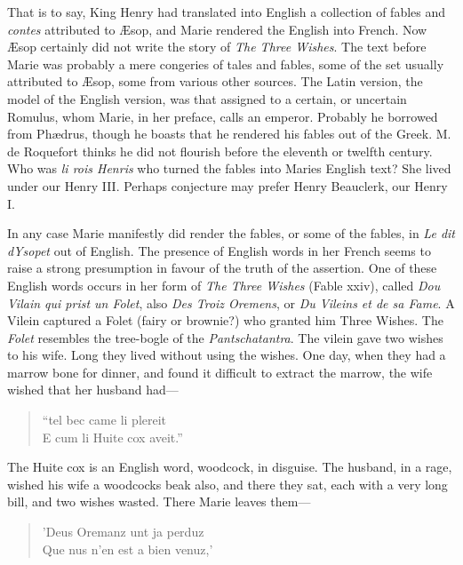 \documentclass[14pt,a4paper]{memoir}
\begin{document}
{That is to say, King Henry had translated into English a collection of
fables and \emph{contes} attributed to Æsop, and Marie rendered the
English into French. Now Æsop certainly did not write the story of
\emph{The Three Wishes}. The text before Marie was probably a mere
congeries of tales and fables, some of the set usually attributed to
Æsop, some from various other sources. The Latin version, the model of
the English version, was that assigned to a certain, or uncertain
Romulus, whom Marie, in her preface, calls an emperor. Probably he
borrowed from Phædrus, though he boasts that he rendered his fables out
of the Greek. M. de Roquefort thinks he did not flourish before the
eleventh or twelfth
century.
Who was \emph{li rois Henris} who turned the fables into
Marie\textquotesingle s English text? She lived under our Henry III.
Perhaps conjecture may prefer Henry Beauclerk, our Henry I.

In any case Marie manifestly did render the fables, or some of the
fables, in \emph{Le dit d\textquotesingle Ysopet} out of English. The
presence of English words in her French seems to raise a strong
presumption in favour of the truth of the assertion. One of these
English words occurs in her form of \emph{The Three Wishes} (Fable
xxiv), called \emph{Dou Vilain qui prist un Folet}, also \emph{Des Troiz
Oremens}, or \emph{Du Vileins et de sa Fame}. A Vilein captured a Folet
(fairy or brownie?) who granted him Three Wishes. The \emph{Folet}
resembles the tree-bogle of the \emph{Pantschatantra}. The vilein gave
two wishes to his wife. Long they lived without using the wishes. One
day, when they had a marrow bone for dinner, and found it difficult to
extract the marrow, the wife wished that her husband had---

\begin{verse}
  \small
\enquote{tel bec came li plereit \\
E cum li Huite cox aveit.}
\end{verse}

The Huite cox is an English word, woodcock, in disguise. The husband, in
a rage, wished his wife a woodcock\textquotesingle s beak also, and
there they sat, each with a very long bill, and two wishes wasted. There
Marie leaves them---

\begin{verse}
  \small
'Deus Oremanz unt ja perduz \\
Que nus n'en est a bien venuz,'
\end{verse}

}
\end{document}
